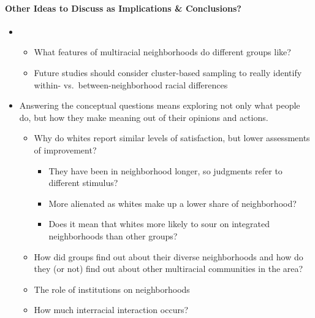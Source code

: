 \documentclass{baderart}
\begin{document}
\paragraph{Other Ideas to Discuss as Implications \& Conclusions?}

\begin{itemize}
\item
\begin{itemize}
\item What features of multiracial neighborhoods do different groups like?
\item Future studies should consider cluster-based sampling to really identify within- vs.\ between-neighborhood racial differences
\end{itemize}

\item Answering the conceptual questions means exploring not only what people do, but how they make meaning out of their opinions and actions. 
\begin{itemize}
\item Why do whites report similar levels of satisfaction, but lower assessments of improvement?
\begin{itemize}
\item They have been in neighborhood longer, so judgments refer to different stimulus?
\item More alienated as whites make up a lower share of neighborhood? 
\item Does it mean that whites more likely to sour on integrated neighborhoods than other groups?
\end{itemize}

\item How did groups find out about their diverse neighborhoods and how do they (or not) find out about other multiracial communities in the area? 

\item The role of institutions on neighborhoods

\item How much interracial interaction occurs? 
\end{itemize}
\end{itemize}


\end{document}
